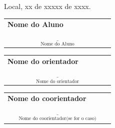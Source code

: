 \documentclass[12pt,a4paper]{article}
\begin{document}
\vspace{2cm}

\begin{center}
    \large Local, xx de xxxxx de xxxx.
\end{center}

\vspace{1.5cm}

\begin{center}
    \renewcommand{\arraystretch}{0}
    \begin{Form}
        \begin{tabular}{l}
            \textbf{Nome do Aluno}\\
            $\underset{\text{Nome do Aluno}}{\underline{\hspace{6cm}}}$
        \end{tabular}
    \end{Form}
\end{center}

\vspace{1.5cm}

\begin{center}
    \renewcommand{\arraystretch}{0}
    \begin{Form}
        \begin{tabular}{l}
            \textbf{Nome do orientador}\\
            $\underset{\text{Nome do orientador}}{\underline{\hspace{6cm}}}$
        \end{tabular}
    \end{Form}
\end{center}

\vspace{1.5cm}

\begin{center}
    \renewcommand{\arraystretch}{0}
    \begin{Form}
        \begin{tabular}{l}
            \textbf{Nome do coorientador}\\
            $\underset{\text{Nome do coorientador(se for o caso)}}{\underline{\hspace{6cm}}}$
        \end{tabular}
    \end{Form}
\end{center}
\end{document}
